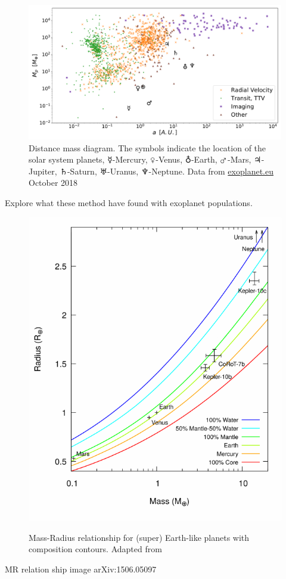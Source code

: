 \fref{}


\begin{figure}
    \centering
    \includegraphics[width=0.\linewidth]{./figures/introduction/exoplanetEU_a_mass.pdf}
    \caption{Distance mass diagram.
        The symbols indicate the location of the solar system planets, $\mercury$-Mercury, $\venus$-Venus, $\earth$-Earth, $\mars$-Mars, $\jupiter$-Jupiter, $\saturn$-Saturn, $\uranus$-Uranus, $\neptune$-Neptune. Data from \href{http://ww.exoplanet.eu}{exoplanet.eu} October 2018}
    \label{fig:pltoverlayadd}
\end{figure}


Explore what these method have found with exoplanet populations.


\begin{figure}[t]
    \centering
    \includegraphics[width=0.4\linewidth]{./figures/introduction/Mass_radius_relation-compostion_Brugger_2017.pdf}\\
    \caption{Mass-Radius relationship for (super) Earth-like planets with composition contours. Adapted from~\citet{brugger_constraints_2017}}
    \label{fig:mass_radius_relation_composition}
\end{figure}

MR relation ship image arXiv:1506.05097~\citet{chen_probabilistic_2016}

